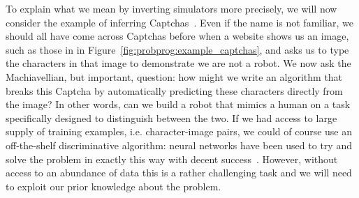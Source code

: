To explain what we mean by inverting simulators more precisely, we will now consider
the example of inferring Captchas~\citep{mansinghka2013approximate}.   Even if the name is not familiar, 
we should all have come across Captchas before when a website shows us an image, such
as those in in Figure~\ref{fig:probprog:example_captchas}, and asks us to
type the characters in that image to demonstrate we are not a robot.  We now ask the
Machiavellian, but important, question: how might we write an algorithm that breaks this Captcha by 
automatically predicting these characters directly from the image? In other words, 
can we build a robot that mimics a human on a task specifically designed to 
distinguish between the two.  If we had access to large supply of training examples, i.e.
character-image pairs, we could of course use an off-the-shelf discriminative algorithm:
neural networks have been used to try and solve the problem in exactly this way with decent
success~\citep{von2008recaptcha}.  However, without access to an abundance of data this is a rather
challenging task and we will need to exploit our prior knowledge about the problem.  

